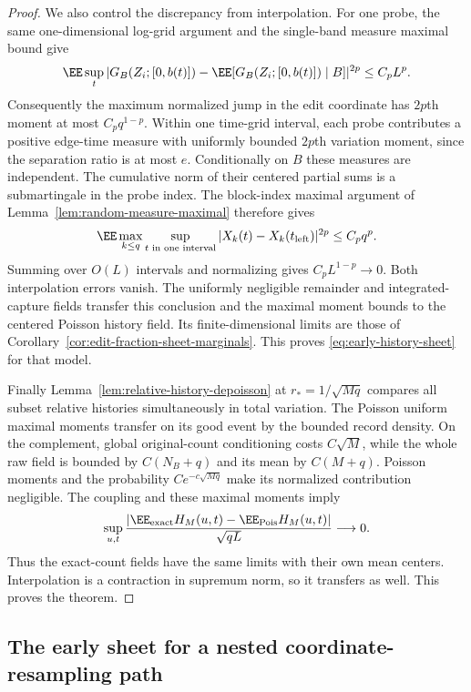 \documentclass[11pt,letterpaper]{article}
\begin{document}
\begin{proof}
We also control the discrepancy from interpolation.
For one probe, the same one-dimensional log-grid argument
and the single-band measure maximal bound give
\[
 \EE\sup_t
 |G_B(Z_i;[0,b(t)])-\EE[G_B(Z_i;[0,b(t)])\mid B]|^{2p}
                                                       \le C_pL^p.
\]
Consequently the maximum normalized jump in the edit
coordinate has $2p$th moment at most $C_pq^{1-p}$.
Within one time-grid interval, each probe contributes a
positive edge-time measure with uniformly bounded $2p$th
variation moment, since the separation ratio is at most $e$.
Conditionally on $B$ these measures are independent.
The cumulative norm of their centered partial sums is a
submartingale in the probe index.
The block-index maximal argument of
Lemma~\ref{lem:random-measure-maximal} therefore gives
\[
 \EE\max_{k\le q}\sup_{t\text{ in one interval}}
 |X_k(t)-X_k(t_{\rm left})|^{2p}\le C_pq^p.
\]
Summing over $O(L)$ intervals and normalizing gives
$C_pL^{1-p}\to0$. Both interpolation errors vanish.
The uniformly negligible remainder and integrated-capture
fields transfer this conclusion and the maximal moment
bounds to the centered Poisson history field.
Its finite-dimensional limits are those of
Corollary~\ref{cor:edit-fraction-sheet-marginals}.
This proves \eqref{eq:early-history-sheet} for that model.

Finally Lemma~\ref{lem:relative-history-depoisson} at
$r_*=1/\sqrt{Mq}$ compares all subset relative histories
simultaneously in total variation. The Poisson uniform
maximal moments transfer on its good event by the bounded
record density. On the complement, global original-count
conditioning costs $C\sqrt M$, while the whole raw field
is bounded by $C(N_B+q)$ and its mean by $C(M+q)$.
Poisson moments and the probability $Ce^{-c\sqrt{Mq}}$
make its normalized contribution negligible.
The coupling and these maximal moments imply
\[
 \sup_{u,t}
 \frac{|\EE_{\rm exact}H_M(u,t)-\EE_{\rm Pois}H_M(u,t)|}
                         {\sqrt{qL}}\longrightarrow0.
\]
Thus the exact-count fields have the same limits with their
own mean centers. Interpolation is a contraction in supremum
norm, so it transfers as well. This proves the theorem.
\end{proof}

\subsection{The early sheet for a nested coordinate-resampling path}
\label{sec:resampling-history-sheet}
\end{document}
